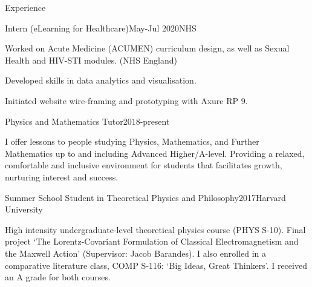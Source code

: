 \documentclass{resume} %
\begin{document}
\begin{rSection}{Experience}
\begin{rSubsection}{Intern (eLearning for Healthcare)}{May-Jul 2020}{NHS}


\item{Worked on Acute Medicine (ACUMEN) curriculum design, as well as Sexual Health and HIV-STI modules. (NHS England)}
\item{Developed skills in data analytics and visualisation.}
\item{Initiated website wire-framing and prototyping with Axure RP 9.}

\end{rSubsection}

\begin{rSubsection}{Physics and Mathematics Tutor}{2018-present}{}
    
\item I offer lessons to people studying Physics, Mathematics, and Further Mathematics up to and including Advanced Higher/A-level. Providing a relaxed, comfortable and inclusive environment for students that facilitates growth, nurturing interest and success. 
\end{rSubsection}

\begin{rSubsection}{Summer School Student in Theoretical Physics and Philosophy}{2017}{Harvard University} 

\item{High intensity undergraduate-level theoretical physics course (PHYS S-10). Final project `The Lorentz-Covariant Formulation of Classical Electromagnetism and the Maxwell Action' (Supervisor: Jacob Barandes). I also enrolled in a comparative literature class, COMP S-116: `Big Ideas, Great Thinkers'. I received an A grade for both courses.}
\end{rSubsection}


\end{rSection}



%

\end{document}

